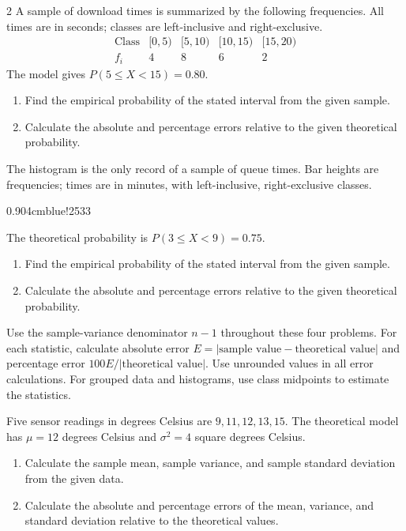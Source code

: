 \begin{multicols}{2}
A sample of download times is summarized by the following frequencies.
All times are in seconds; classes are left-inclusive and right-exclusive.
\[
\begin{array}{c|rrrr}
\text{Class}&[0,5)&[5,10)&[10,15)&[15,20)\\\hline
f_i&4&8&6&2
\end{array}
\]
The model gives $P(5\le X<15)=0.80$.
\begin{enumerate}[label=\textbf{(\alph*)}]
\item Find the empirical probability of the stated interval from the given sample. 
\item Calculate the absolute and percentage errors relative to the given theoretical probability. 
\end{enumerate}

The histogram is the only record of a sample of queue times. Bar heights
are frequencies; times are in minutes, with left-inclusive, right-exclusive classes.
\begin{center}
{0.90\linewidth}{4cm}{blue!25}{3}{3}
\end{center}\vspace{-4mm}
The theoretical probability is $P(3\le X<9)=0.75$.
\begin{enumerate}[label=\textbf{(\alph*)}]
\item Find the empirical probability of the stated interval from the given sample. 
\item Calculate the absolute and percentage errors relative to the given theoretical probability. 
\end{enumerate}

Use the sample-variance denominator $n-1$ throughout these four problems.
For each statistic, calculate absolute error $E=|\text{sample value}-\text{theoretical value}|$
and percentage error $100E/|\text{theoretical value}|$. Use unrounded values in all error calculations.
For grouped data and histograms, use class midpoints to estimate the statistics.

Five sensor readings in degrees Celsius are $9,11,12,13,15$.
The theoretical model has $\mu=12$ degrees Celsius and
$\sigma^2=4$ square degrees Celsius.
\begin{enumerate}[label=\textbf{(\alph*)}]
\item Calculate the sample mean, sample variance, and sample standard deviation from the given data. 
\item Calculate the absolute and percentage errors of the mean, variance, and standard deviation relative to the theoretical values. 
\end{enumerate}


\end{multicols}

